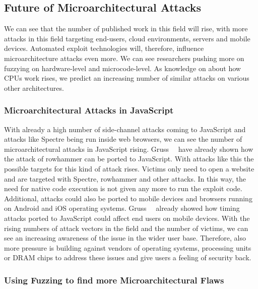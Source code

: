 \subsection{Future of Microarchitectural Attacks}

We can see that the number of published work in this field will rise, with more
attacks in this field targeting end-users, cloud environments, servers and
mobile devices. Automated exploit technologies will, therefore, influence
microarchitecture attacks even more. We can see researchers pushing more on
fuzzying on hardware-level and microcode-level. As knowledge on about how CPUs
work rises, we predict an increasing number of similar attacks on various other
architectures.

\subsubsection{Microarchitectural Attacks in JavaScript}

With already a high number of side-channel attacks coming to JavaScript and
attacks like Spectre being run inside web browsers, we can see the number of
microarchitectural attacks in JavaScript rising. Gruss~\etal~\cite{rowhammerjs}
have already shown how the attack of rowhammer can be ported to JavaScript. With
attacks like this the possible targets for this kind of attack rises. Victims
only need to open a website and are targeted with Spectre, rowhammer and other
attacks. In this way, the need for native code execution is not given any more
to run the exploit code. Additional, attacks could also be ported to mobile
devices and browsers running on Android and iOS operating systems.
Gruss~\etal~\cite{keytimejs} already showed how timing attacks ported to
JavaScript could affect end users on mobile devices. With the rising numbers of
attack vectors in the field and the number of victims, we can see an increasing
awareness of the issue in the wider user base. Therefore, also more pressure is
building against vendors of operating systems, processing units or DRAM chips to
address these issues and give users a feeling of security back.

\subsubsection{Using Fuzzing to find more Microarchitectural Flaws}

